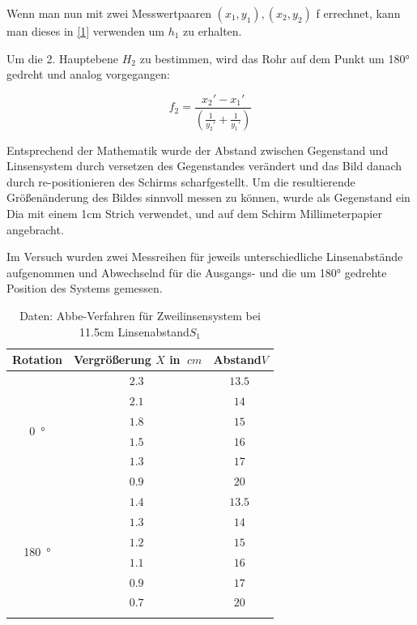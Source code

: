 Wenn man nun mit zwei Messwertpaaren $(x_1, y_1), (x_2, y_2)$ f errechnet, kann man dieses in \ref{1} verwenden um $h_1$ zu erhalten.

Um die 2. Hauptebene $H_2$ zu bestimmen, wird das Rohr auf dem Punkt um 180° gedreht und analog vorgegangen:

\begin{equation} \label{4}
    f_2 = \frac{x_2' - x_1'}{(\frac{1}{y_2'} + \frac{1}{y_1'})}
\end{equation}

Entsprechend der Mathematik wurde der Abstand zwischen Gegenstand und Linsensystem durch versetzen des Gegenstandes verändert und das Bild danach durch re-positionieren des Schirms scharfgestellt.
Um die resultierende Größenänderung des Bildes sinnvoll messen zu können, wurde als Gegenstand ein Dia mit einem 1cm Strich verwendet, und auf dem Schirm Millimeterpapier angebracht.

Im Versuch wurden zwei Messreihen für jeweils unterschiedliche Linsenabstände aufgenommen und Abwechselnd für die Ausgangs- und die um 180° gedrehte Position des Systems gemessen.

\begin{table}[h!]
    \begin{center}
        \caption{Daten: Abbe-Verfahren für Zweilinsensystem bei 11.5cm Linsenabstand$S_1$}
        \begin{tabular}{ccc}
            \hline
            Rotation   &  Vergrößerung  $X$ in $\SI{}{cm}$    & Abstand$V$ \\
            \hline
            \multirow{6}{*}{\SI{0}{\degree}}    & $\SI{2.3}{}$ & $\SI{13.5}{}$ \\
                                                & $\SI{2.1}{}$ & $\SI{14}{}$ \\
                                                & $\SI{1.8}{}$ & $\SI{15}{}$ \\
                                                & $\SI{1.5}{}$ & $\SI{16}{}$ \\
                                                & $\SI{1.3}{}$ & $\SI{17}{}$ \\
                                                & $\SI{0.9}{}$ & $\SI{20}{}$ \\
            \hline
            \multirow{6}{*}{\SI{180}{\degree}}  & $\SI{1.4}{}$ & $\SI{13.5}{}$ \\
                                                & $\SI{1.3}{}$ & $\SI{14}{}$ \\
                                                & $\SI{1.2}{}$ & $\SI{15}{}$ \\
                                                & $\SI{1.1}{}$ & $\SI{16}{}$ \\
                                                & $\SI{0.9}{}$ & $\SI{17}{}$ \\
                                                & $\SI{0.7}{}$ & $\SI{20}{}$ \\
            \hline
            \label{tab:Abbe1}
        \end{tabular}
    \end{center}
\end{table}

